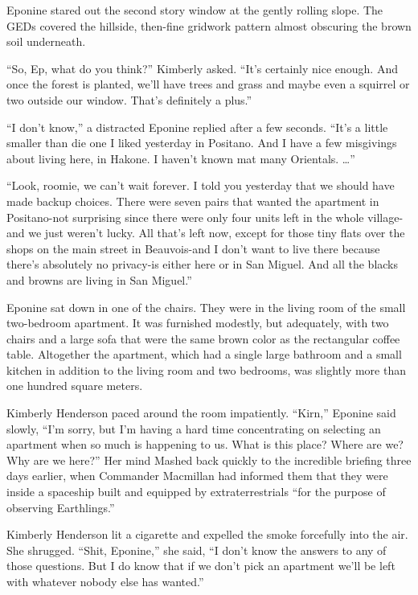 \documentclass[]{article}
\begin{document}
{Eponine stared out the second story window at the gently rolling slope.  The GEDs covered the hillside, then-fine gridwork pattern almost obscuring the brown soil underneath.

“So, Ep, what do you think?” Kimberly asked.  “It’s certainly nice enough.  And once the forest is planted, we’ll have trees and grass and maybe even a squirrel or two outside our window.  That’s definitely a plus.”

“I don’t know,” a distracted Eponine replied after a few seconds.  “It’s a little smaller than die one I liked yesterday in Positano.  And I have a few misgivings about living here, in Hakone.  I haven’t known mat many Orientals.  …”

“Look, roomie, we can’t wait forever.  I told you yesterday that we should have made backup choices.  There were seven pairs that wanted the apartment in Positano-not surprising since there were only four units left in the whole village-and we just weren’t lucky.  All that’s left now, except for those tiny flats over the shops on the main street in Beauvois-and I don’t want to live there because there’s absolutely no privacy-is either here or in San Miguel.  And all the blacks and browns are living in San Miguel.”

Eponine sat down in one of the chairs.  They were in the living room of the small two-bedroom apartment.  It was furnished modestly, but adequately, with two chairs and a large sofa that were the same brown color as the rectangular coffee table.  Altogether the apartment, which had a single large bathroom and a small kitchen in addition to the living room and two bedrooms, was slightly more than one hundred square meters.

Kimberly Henderson paced around the room impatiently.  “Kirn,” Eponine said slowly, “I’m sorry, but I’m having a hard time concentrating on selecting an apartment when so much is happening to us.  What is this place? Where are we? Why are we here?” Her mind Mashed back quickly to the incredible briefing three days earlier, when Commander Macmillan had informed them that they were inside a spaceship built and equipped by extraterrestrials “for the purpose of observing Earthlings.”

Kimberly Henderson lit a cigarette and expelled the smoke forcefully into the air.  She shrugged.  “Shit, Eponine,” she said, “I don’t know the answers to any of those questions.  But I do know that if we don’t pick an apartment we’ll be left with whatever nobody else has wanted.”

}
\end{document}
